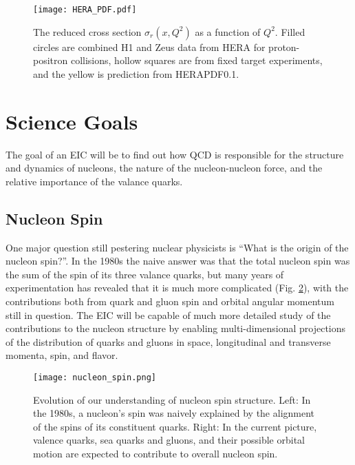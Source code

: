 \begin{figure}[ht]
	\centering
	\texttt{[image: HERA\_PDF.pdf]}
	\caption{The reduced cross section $\sigma_{r}(x,Q^2)$ as a function of $Q^2$. Filled circles are combined H1 and Zeus data from HERA for proton-positron collisions, hollow squares are from fixed target experiments, and the yellow is prediction from HERAPDF0.1. \cite{HERAStructureFunction}}
	\label{fig:HERA_pdf}
\end{figure}

\section{Science Goals}
The goal of an EIC will be to find out how QCD is responsible for the structure and dynamics of nucleons, the nature of the nucleon-nucleon force, and the relative importance of the valance quarks.

\subsection{Nucleon Spin}
One major question still pestering nuclear physicists is ``What is the origin of the nucleon spin?''. In the 1980s the naive answer was that the total nucleon spin was the sum of the spin of its three valance quarks, but many years of experimentation has revealed that it is much more complicated (Fig. \ref{fig:nucleon_spin}), with the contributions both from quark and gluon spin and orbital angular momentum still in question. The EIC will be capable of much more detailed study of the contributions to the nucleon structure by enabling multi-dimensional projections of the distribution of quarks and gluons in space, longitudinal and transverse momenta, spin, and flavor.

\begin{figure}[ht]
	\centering
	\texttt{[image: nucleon\_spin.png]}
	\caption{Evolution of our understanding of nucleon spin structure. Left: In the 1980s, a nucleon’s spin was naively explained by the alignment of the spins of its constituent quarks. Right: In the current picture, valence quarks, sea quarks and gluons, and their possible orbital motion are expected to contribute to overall nucleon spin. \cite{EICWhitePaper}}
	\label{fig:nucleon_spin}
\end{figure}

